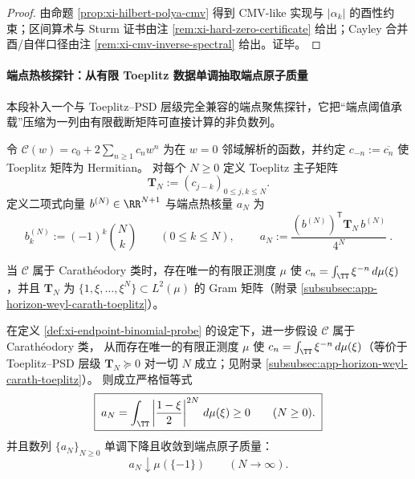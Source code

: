 \begin{proof}
由命题 \ref{prop:xi-hilbert-polya-cmv} 得到 CMV-like 实现与 \(|\alpha_k|\) 的酉性约束；区间算术与 Sturm 证书由注 \ref{rem:xi-hard-zero-certificate} 给出；Cayley 合并酉/自伴口径由注 \ref{rem:xi-cmv-inverse-spectral} 给出。证毕。
\end{proof}

\paragraph{端点热核探针：从有限 Toeplitz 数据单调抽取端点原子质量}
本段补入一个与 Toeplitz--PSD 层级完全兼容的端点聚焦探针，它把“端点阈值承载”压缩为一列由有限截断矩阵可直接计算的非负数列。

\begin{definition}[端点二项式探针与热核量]\label{def:xi-endpoint-binomial-probe}
令 \(\mathscr{C}(w)=c_0+2\sum_{n\ge 1}c_n w^n\) 为在 \(w=0\) 邻域解析的函数，并约定 \(c_{-n}:=\overline{c_n}\) 使 Toeplitz 矩阵为 Hermitian。
对每个 \(N\ge 0\) 定义 Toeplitz 主子矩阵
\[
\mathbf{T}_N:=(c_{j-k})_{0\le j,k\le N}.
\]
定义二项式向量 \(b^{(N)}\in\RR^{N+1}\) 与端点热核量 \(a_N\) 为
\[
b^{(N)}_k:=(-1)^k\binom{N}{k}\qquad(0\le k\le N),
\qquad
\boxed{\ a_N:=\frac{(b^{(N)})^{\mathsf T}\mathbf{T}_N\,b^{(N)}}{4^N}\ }.
\]
\par
当 \(\mathscr{C}\) 属于 Carath\'eodory 类时，存在唯一的有限正测度 \(\mu\) 使 \(c_n=\int_{\TT}\xi^{-n}\,d\mu(\xi)\)，并且 \(\mathbf{T}_N\) 为 \(\{1,\xi,\dots,\xi^N\}\subset L^2(\mu)\) 的 Gram 矩阵（附录 \ref{subsubsec:app-horizon-weyl-carath-toeplitz}）。
\end{definition}

\begin{theorem}[端点热核恒等式与单调极限]\label{thm:xi-endpoint-heat-kernel-probe}
在定义 \ref{def:xi-endpoint-binomial-probe} 的设定下，进一步假设 \(\mathscr{C}\) 属于 Carath\'eodory 类，
从而存在唯一的有限正测度 \(\mu\) 使 \(c_n=\int_{\TT}\xi^{-n}\,d\mu(\xi)\)（等价于 Toeplitz--PSD 层级 \(\mathbf{T}_N\succeq 0\) 对一切 \(N\) 成立；见附录 \ref{subsubsec:app-horizon-weyl-carath-toeplitz}）。
则成立严格恒等式
\begin{equation}\label{eq:xi-endpoint-heat-kernel-identity}
\boxed{\;
a_N=\int_{\TT}\left|\frac{1-\xi}{2}\right|^{2N}\,d\mu(\xi)\ge 0\qquad(N\ge 0).
\;}
\end{equation}
并且数列 \(\{a_N\}_{N\ge 0}\) 单调下降且收敛到端点原子质量：
\begin{equation}\label{eq:xi-endpoint-heat-kernel-limit}
\boxed{\;
a_N\downarrow \mu(\{-1\})\qquad(N\to\infty).
\;}
\end{equation}
\end{theorem}


